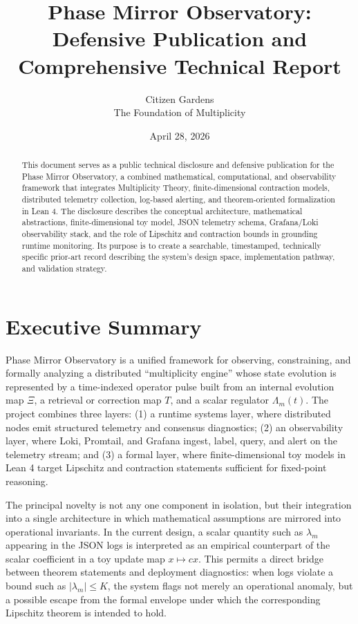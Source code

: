 \documentclass[11pt]{article}
\title{Phase Mirror Observatory: \\ Defensive Publication and Comprehensive Technical Report}
\author{Citizen Gardens \\ The Foundation of Multiplicity}
\date{April 28, 2026}
\begin{document}
\maketitle

\begin{abstract}
This document serves as a public technical disclosure and defensive publication for the Phase Mirror Observatory, a combined mathematical, computational, and observability framework that integrates Multiplicity Theory, finite-dimensional contraction models, distributed telemetry collection, log-based alerting, and theorem-oriented formalization in Lean 4. The disclosure describes the conceptual architecture, mathematical abstractions, finite-dimensional toy model, JSON telemetry schema, Grafana/Loki observability stack, and the role of Lipschitz and contraction bounds in grounding runtime monitoring. Its purpose is to create a searchable, timestamped, technically specific prior-art record describing the system's design space, implementation pathway, and validation strategy.
\end{abstract}
\newpage
\tableofcontents

\section{Executive Summary}
Phase Mirror Observatory is a unified framework for observing, constraining, and formally analyzing a distributed ``multiplicity engine'' whose state evolution is represented by a time-indexed operator pulse built from an internal evolution map $\Xi$, a retrieval or correction map $T$, and a scalar regulator $\Lambda_m(t)$. The project combines three layers: (1) a runtime systems layer, where distributed nodes emit structured telemetry and consensus diagnostics; (2) an observability layer, where Loki, Promtail, and Grafana ingest, label, query, and alert on the telemetry stream; and (3) a formal layer, where finite-dimensional toy models in Lean 4 target Lipschitz and contraction statements sufficient for fixed-point reasoning.

The principal novelty is not any one component in isolation, but their integration into a single architecture in which mathematical assumptions are mirrored into operational invariants. In the current design, a scalar quantity such as $\lambda_m$ appearing in the JSON logs is interpreted as an empirical counterpart of the scalar coefficient in a toy update map $x \mapsto c x$. This permits a direct bridge between theorem statements and deployment diagnostics: when logs violate a bound such as $|\lambda_m| \le K$, the system flags not merely an operational anomaly, but a possible escape from the formal envelope under which the corresponding Lipschitz theorem is intended to hold.
\end{document}
